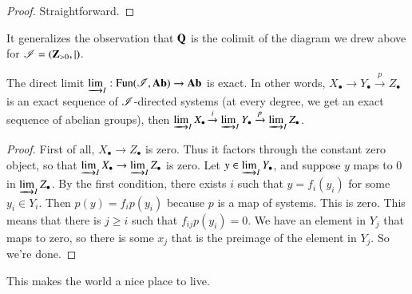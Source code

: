 \begin{proof}
Straightforward.
\end{proof}
It generalizes the observation that $\mathbf Q$ is the colimit of the diagram we drew above for $\mathscr I=(\mathbf Z_{>0},|)$.
\begin{corollary}
The direct limit $\varinjlim_I:\operatorname{Fun}(\mathscr I,\mathbf{Ab})\to\mathbf{Ab}$ is exact. In other words, $X_\bullet\to Y_\bullet\xrightarrow{p} Z_\bullet$ is an exact sequence of $\mathscr I$-directed systems (at every degree, we get an exact sequence of abelian groups), then $\varinjlim_IX_\bullet\xrightarrow{i} \varinjlim_IY_\bullet\xrightarrow{p} \varinjlim_IZ_\bullet$.
\end{corollary}
\begin{proof}
First of all, $X_\bullet\to Z_\bullet$ is zero. Thus it factors through the constant zero object, so that $\varinjlim_IX_\bullet\to \varinjlim_I Z_\bullet$ is zero. Let $y\in \varinjlim_IY_\bullet$, and suppose $y$ maps to $0$ in $\varinjlim_IZ_\bullet$. By the first condition, there exists $i$ such that $y=f_i(y_i)$ for some $y_i\in Y_i$. Then $p(y)=f_ip(y_i)$ because $p$ is a map of systems. This is zero. This means that there is $j\geq i$ such that $f_{ij}p(y_i)=0$. We have an element in $Y_j$ that maps to zero, so there is some $x_j$ that is the preimage of the element in $Y_j$. So we're done.
\end{proof}
This makes the world a nice place to live.
